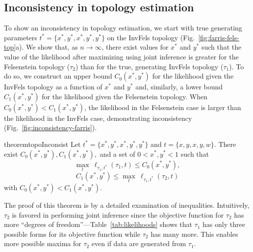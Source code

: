 \documentclass[11pt]{article}
\newcommand{\nCols}{n}
\begin{document}
\subsection*{Inconsistency in topology estimation}

To show an inconsistency in topology estimation, we start with true generating parameters $t^*=\{x^*, y^*, x^*, y^*, y^*\}$ on the InvFels topology (Fig.~\ref{fig:farris-fels-top}a).
We show that, as $\nCols\rightarrow\infty$, there exist values for $x^*$ and $y^*$ such that the value of the likelihood after maximizing using joint inference is greater for the Felsenstein topology ($\tau_2$) than for the true, generating InvFels topology ($\tau_1$).
To do so, we construct an upper bound $C_0(x^*, y^*)$ for the likelihood given the InvFels topology as a function of $x^*$ and $y^*$ and, similarly, a lower bound $C_1(x^*, y^*)$ for the likelihood given the Felsenstein topology.
When $C_0(x^*, y^*) < C_1(x^*, y^*)$, the likelihood in the Felsenstein case is larger than the likelihood in the InvFels case, demonstrating inconsistency (Fig.~\ref{fig:inconsistency-farris}).
\begin{restatable}{theorem}{topoInconsist}
Let $t^*=\{x^*, y^*, x^*, y^*, y^*\}$ and $t=\{x, y, x, y, w\}$.
There exist $C_0(x^*, y^*), C_1(x^*, y^*),$ and a set of $0 < x^*, y^* < 1$ such that
\[
\max_{t} \ \ell_{\tau_1,t^*}(\tau_1, t) \le C_0(x^*, y^*),
\]
\[
C_1(x^*, y^*) \le \max_{t} \ \ell_{\tau_1,t^*}(\tau_2, t)
\]
with $C_0(x^*, y^*) < C_1(x^*, y^*)$.
\end{restatable}
The proof of this theorem is by a detailed examination of inequalities.
Intuitively, $\tau_2$ is favored in performing joint inference since the objective function for $\tau_2$ has more ``degrees of freedom''---Table~\ref{tab:likelihoods} shows that $\tau_1$ has only three possible forms for its objective function while $\tau_2$ has many more.
This enables more possible maxima for $\tau_2$ even if data are generated from $\tau_1$.
\end{document}
